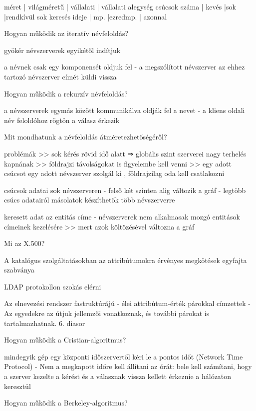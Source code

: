 \documentclass[12pt]{article}
\begin{document}
\begin{description}[style=unboxed]
        méret         | világméretű | vállalati  | vállalati alegység
        csúcsok száma | kevés       |sok         |rendkívül sok
        keresés ideje | mp.         |ezredmp.    | azonnal
    \item  Hogyan működik az iteratív névfeloldás?
    \item gyökér névszerverek egyikétől indítjuk
    \item a névnek csak egy komponensét oldjuk fel
        - a megszólított névszerver az ehhez tartozó névszerver címét küldi vissza
    \item  Hogyan működik a rekurzív névfeloldás?
    \item a névszerverek egymás között kommunikálva oldják fel a nevet
        - a kliens oldali név feloldóhoz rögtön a válasz érkezik
    \item  Mit mondhatunk a névfeloldás átméretezhetőségéről?
    \item problémák 
        >> sok kérés rövid idő alatt ⇒ globális szint szerverei nagy terhelés kapnának
        >> földrajzi távolságokat is figyelembe kell venni
        >> egy adott csúcsot egy adott névszerver szolgál ki , földrajzilag oda kell csatlakozni
    \item csúcsok adatai sok névszerveren
        - felső két szinten alig változik a gráf
        - legtöbb csúcs adatairól másolatok készíthetők több névszerverre
    \item keresett adat az entitás címe
        - névszerverek nem alkalmasak mozgó entitások címeinek kezelésére >>  mert azok költözésével változna a gráf
    \item  Mi az X.500?
    \item A katalógus szolgáltatásokban az attribútumokra érvényes megkötések egyfajta szabványa
    \item LDAP protokollon szokás elérni 
    \item Az elnevezési rendszer fastruktúrájú
        - élei attribútum-érték párokkal címzettek
        - Az egyedekre az útjuk jellemzői vonatkoznak, és további párokat is tartalmazhatnak.
        6. diasor
    \item  Hogyan működik a Cristian-algoritmus?
    \item mindegyik gép egy központi időszervertől kéri le a pontos időt (Network Time Protocol)	
        - Nem a megkapott időre kell állítani az órát: bele kell számítani, hogy 
        a szerver kezelte a kérést és a válasznak vissza kellett érkeznie a hálózaton keresztül
    \item  Hogyan működik a Berkeley-algoritmus?

\end{description}
\end{document}
